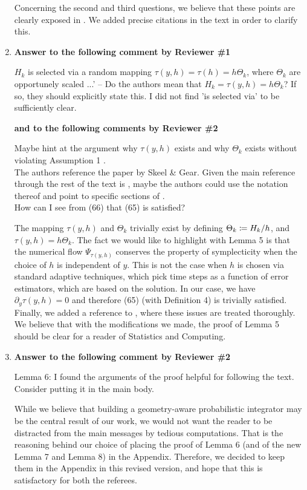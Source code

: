 \documentclass[10pt]{article}
\begin{document}
\begin{enumerate}
	Concerning the second and third questions, we believe that these points are clearly exposed in \cite[Chapter IX]{HLW06}. We added precise citations in the text in order to clarify this. 
	\item \textbf{Answer to the following comment by Reviewer \#1}
	\begin{itquote}
		$H_k$ is selected via a random mapping $\tau(y,h)=\tau(h)=h\Theta_k$, where $\Theta_k$ are opportunely scaled ...' -- Do the authors mean that $H_k=\tau(y,h)=h\Theta_k$? If so, they should explicitly state this. I did not find 'is selected via' to be sufficiently clear.
	\end{itquote}
	\textbf{and to the following comments by Reviewer \#2}
	\begin{itquote}
		Maybe hint at the argument why $\tau(y, h)$ exists and why $\Theta_k$ exists without violating Assumption 1 .\\
		The authors reference the paper by Skeel \& Gear. Given the main reference through the rest of the text is \cite{HLW06}, maybe the authors could use the notation thereof and point to specific sections of \cite{HLW06}.\\
		How can I see from (66) that (65) is satisfied?
	\end{itquote}
	The mapping $\tau(y, h)$ and $\Theta_k$ trivially exist by defining $\Theta_k \coloneqq H_k / h$, and $\tau(y, h) = h \Theta_k$. The fact we would like to highlight with Lemma 5 is that the numerical flow $\Psi_{\tau(y, h)}$ conserves the property of symplecticity when the choice of $h$ is independent of $y$. This is not the case when $h$ is chosen via standard adaptive techniques, which pick time steps as a function of error estimators, which are based on the solution. In our case, we have $\partial_y \tau(y, h) = 0$ and therefore (65) (with Definition 4) is trivially satisfied. Finally, we added a reference to \cite[Section VIII.1]{HLW06}, where these issues are treated thoroughly. We believe that with the modifications we made, the proof of Lemma 5 should be clear for a reader of Statistics and Computing.
	\item \textbf{Answer to the following comment by Reviewer \#2}
	\begin{itquote}
		Lemma 6: I found the arguments of the proof helpful for following the text. Consider putting it in the main body.
	\end{itquote}
	While we believe that building a geometry-aware probabilistic integrator may be the central result of our work, we would not want the reader to be distracted from the main messages by tedious computations. That is the reasoning behind our choice of placing the proof of Lemma 6 (and of the new Lemma 7 and Lemma 8) in the Appendix. Therefore, we decided to keep them in the Appendix in this revised version, and hope that this is satisfactory for both the referees. 

\end{enumerate}
\end{document}
